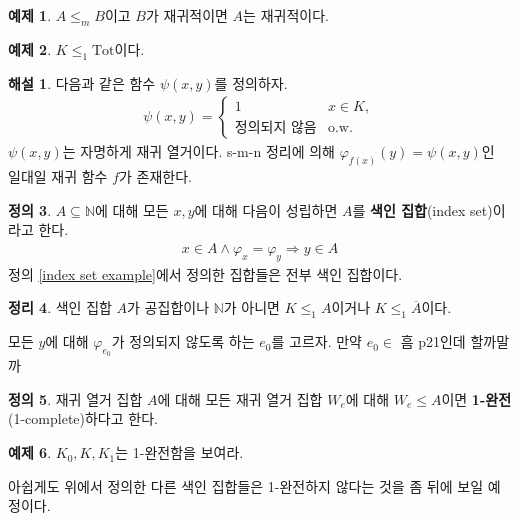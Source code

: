 \documentclass[b5paper, 11pt]{book}
\theoremstyle{definition}
\newtheorem{defn}{정의}[chapter]
\newtheorem{thm}[defn]{정리}
\newtheorem{ex}[defn]{예제}
\newtheorem*{ans*}{해설}
\newenvironment{pf*}{\pushQED{\qed}\pf}
{\popQED\endpf}
\begin{document}
\begin{ex}
    $A \le_m B$이고 $B$가 재귀적이면 $A$는 재귀적이다.
\end{ex}
\begin{ex}
    $K \le_1 \mathrm{Tot}$이다.
\end{ex}
\begin{ans*}
    다음과 같은 함수 $\psi(x,y)$를 정의하자.
    \begin{align*}
        \psi(x, y) = 
        \begin{cases}
            1 & x \in K, \\
            \text{정의되지 않음}    &   \text{o.w.}
        \end{cases}
    \end{align*}
    $\psi(x,y)$는 자명하게 재귀 열거이다. s-m-n 정리에 의해 $\varphi_{f(x)} (y) = \psi (x, y)$인 일대일 재귀 함수 $f$가 존재한다. 
\end{ans*}
\begin{defn}
    $A \subseteq \mathbb{N}$에 대해 모든 $x, y$에 대해 다음이 성립하면 $A$를 \textbf{색인 집합}(index set)이라고 한다.
    \begin{align*}
        x \in A \wedge \varphi_x = \varphi_y \Rightarrow y \in A
    \end{align*}
    정의 \ref{index set example}에서 정의한 집합들은 전부 색인 집합이다.
\end{defn}
\begin{thm}
    색인 집합 $A$가 공집합이나 $\mathbb{N}$가 아니면 $K \le_1 A$이거나 $K \le_1 \overline{A}$이다.
\end{thm}
\begin{pf*}
    모든 $y$에 대해 $\varphi_{e_0}$가 정의되지 않도록 하는 $e_0$를 고르자. 만약 $e_0 \in $ 흠 p21인데 할까말까
\end{pf*}
\begin{defn}
    재귀 열거 집합 $A$에 대해 모든 재귀 열거 집합 $W_e$에 대해 $W_e \le A$이면 \textbf{1-완전}(1-complete)하다고 한다. 
\end{defn}
\begin{ex}
    $K_0, K, K_1$는 1-완전함을 보여라. 
\end{ex}
아쉽게도 위에서 정의한 다른 색인 집합들은 1-완전하지 않다는 것을 좀 뒤에 보일 예정이다.
\end{document}
